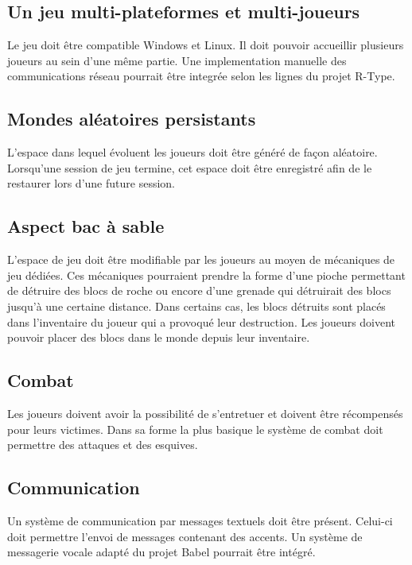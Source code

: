 \documentclass{article}
\begin{document}
\subsection{Un jeu multi-plateformes et multi-joueurs}
Le jeu doit être compatible Windows et Linux.
Il doit pouvoir accueillir plusieurs joueurs au sein d'une même partie.
Une implementation manuelle des communications réseau pourrait être
integrée selon les lignes du projet R-Type.
\subsection{Mondes aléatoires persistants}
L'espace dans lequel évoluent les joueurs doit être généré de façon aléatoire.
Lorsqu'une session de jeu termine, cet espace doit être enregistré afin de le
restaurer lors d'une future session.
\subsection{Aspect bac à sable}
L'espace de jeu doit être modifiable par les joueurs au moyen de
mécaniques de jeu dédiées. Ces mécaniques pourraient prendre la forme
d'une pioche permettant de détruire des blocs de roche ou encore
d'une grenade qui détruirait des blocs jusqu'à une certaine distance.
Dans certains cas, les blocs détruits sont placés dans l'inventaire
du joueur qui a provoqué leur destruction. Les joueurs doivent pouvoir
placer des blocs dans le monde depuis leur inventaire.
\subsection{Combat}
Les joueurs doivent avoir la possibilité de s'entretuer et doivent
être récompensés pour leurs victimes. Dans sa forme la plus basique
le système de combat doit permettre des attaques et des esquives.
\subsection{Communication}
Un système de communication par messages textuels doit être présent.
Celui-ci doit permettre l'envoi de messages contenant des accents.
Un système de messagerie vocale adapté du projet Babel pourrait être
intégré.
\end{document}
